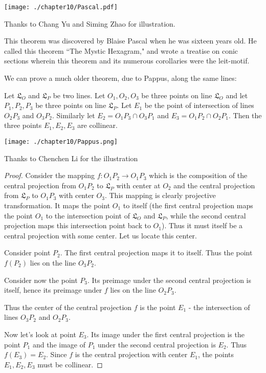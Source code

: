 {{\texttt{[image: ./chapter10/Pascal.pdf]}

Thanks to Chang Yu and Siming Zhao for illustration.

This theorem was discovered by Blaise Pascal when he was sixteen years old. He called this theorem ``The Mystic Hexagram," and wrote a treatise on conic sections wherein this theorem and its numerous corollaries were the leit-motif.

We can prove a much older theorem, due to Pappus, along the same lines:

\begin{theorem}
Let $\mathfrak{L}_O$ and $\mathfrak{L}_P$ be two lines. Let $O_1,O_2,O_3$ be three points on line $\mathfrak{L}_O$ and let $P_1,P_2,P_3$ be three points on line $\mathfrak{L}_P$. Let $E_1$ be the point of intersection of lines $O_2P_3$ and $O_3P_2$. Similarly let $E_2=O_1P_3\cap O_3P_1$ and $E_3=O_1P_2 \cap O_2P_1$. Then the three points $E_1,E_2,E_3$ are collinear.
\end{theorem}

\texttt{[image: ./chapter10/Pappus.png]}

Thanks to Chenchen Li for the illustration

\begin{proof}
Consider the mapping $f:O_1P_2\rightarrow O_1P_3$ which is the composition of the central projection from $O_1P_2$ to $\mathfrak{L}_P$ with center at $O_2$ and the central projection from $\mathfrak{L}_P$ to $O_1P_3$ with center $O_3$. This mapping is clearly projective transformation. It maps the point $O_1$ to itself (the first central projection maps the point $O_1$ to the intersection point of $\mathfrak{L}_O$ and $\mathfrak{L}_P$, while the second central projection maps this intersection point back to $O_1$). Thus it must itself be a central projection with some center. Let us locate this center.

Consider point $P_2$. The first central projection maps it to itself. Thus the point $f(P_2)$ lies on the line $O_3P_2$.

Consider now the point $P_3$. Its preimage under the second central projection is itself, hence its preimage under $f$ lies on the line $O_2P_3$.

Thus the center of the central projection $f$ is the point $E_1$ - the intersection of lines $O_3P_2$ and $O_2P_3$.

Now let's look at point $E_3$. Its image under the first central projection is the point $P_1$ and the image of $P_1$ under the second central projection is $E_2$. Thus $f(E_3)=E_2$. Since $f$ is the central projection with center $E_1$, the points $E_1,E_2,E_3$ must be collinear.


\end{proof}}}
